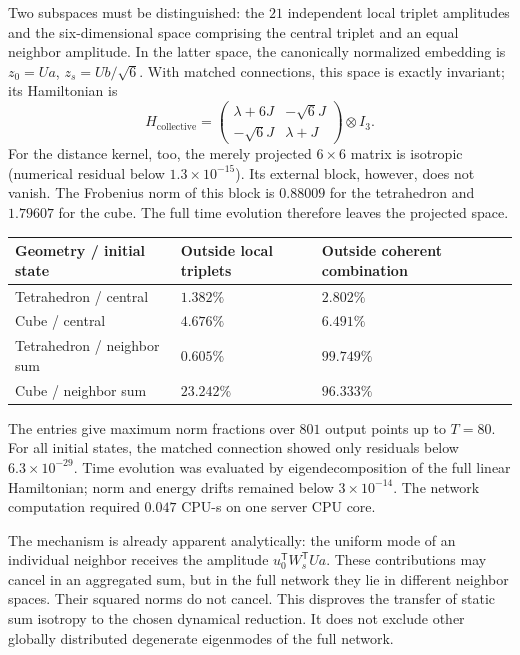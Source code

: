 \documentclass[a4paper,11pt]{article}
\newenvironment{drafttable}{\begin{center}\small\renewcommand{\arraystretch}{1.2}}{\end{center}}
\begin{document}
Two subspaces must be distinguished: the $21$ independent local triplet amplitudes and the six-dimensional space comprising the central triplet and an equal neighbor amplitude. In the latter space, the canonically normalized embedding is $z_0=Ua$, $z_s=Ub/\sqrt6$. With matched connections, this space is exactly invariant; its Hamiltonian is
\begin{equation}\label{eq:collective}
H_{\mathrm{collective}}=
\begin{pmatrix}\lambda+6J&-\sqrt6J\\-\sqrt6J&\lambda+J\end{pmatrix}\otimes I_3.
\end{equation}
For the distance kernel, too, the merely projected $6\times6$ matrix is isotropic (numerical residual below $1.3\times10^{-15}$). Its external block, however, does not vanish. The Frobenius norm of this block is $0.88009$ for the tetrahedron and $1.79607$ for the cube. The full time evolution therefore leaves the projected space.

\begin{drafttable}
\begin{tabularx}{\linewidth}{@{}lXX@{}}\toprule
Geometry / initial state & Outside local triplets & Outside coherent combination\\\midrule
Tetrahedron / central & $1.382\%$ & $2.802\%$\\
Cube / central & $4.676\%$ & $6.491\%$\\
Tetrahedron / neighbor sum & $0.605\%$ & $99.749\%$\\
Cube / neighbor sum & $23.242\%$ & $96.333\%$\\\bottomrule
\end{tabularx}
\end{drafttable}
The entries give maximum norm fractions over $801$ output points up to $T=80$. For all initial states, the matched connection showed only residuals below $6.3\times10^{-29}$. Time evolution was evaluated by eigendecomposition of the full linear Hamiltonian; norm and energy drifts remained below $3\times10^{-14}$. The network computation required $0.047$ CPU-s on one server CPU core.

The mechanism is already apparent analytically: the uniform mode of an individual neighbor receives the amplitude $u_0^\mathsf TW_s^\mathsf TUa$. These contributions may cancel in an aggregated sum, but in the full network they lie in different neighbor spaces. Their squared norms do not cancel. This disproves the transfer of static sum isotropy to the chosen dynamical reduction. It does not exclude other globally distributed degenerate eigenmodes of the full network.
\end{document}
